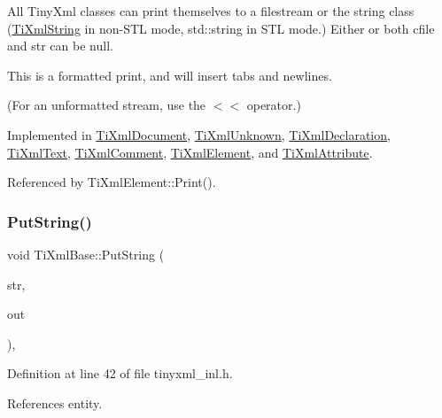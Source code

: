 All Tiny\+Xml classes can print themselves to a filestream or the string class (\hyperlink{class_ti_xml_string}{Ti\+Xml\+String} in non-\/\+S\+TL mode, std\+::string in S\+TL mode.) Either or both cfile and str can be null.

This is a formatted print, and will insert tabs and newlines.

(For an unformatted stream, use the $<$$<$ operator.) 

Implemented in \hyperlink{class_ti_xml_document_aa9e166fae51da603641380a964f21eeb}{Ti\+Xml\+Document}, \hyperlink{class_ti_xml_unknown_a5793fbc48ab3419783c0e866ca2d334e}{Ti\+Xml\+Unknown}, \hyperlink{class_ti_xml_declaration_ae46cff6565f299210ab945e78bf28514}{Ti\+Xml\+Declaration}, \hyperlink{class_ti_xml_text_a75f6895906333894e2574cc8cf77ea79}{Ti\+Xml\+Text}, \hyperlink{class_ti_xml_comment_a873171beac19d40f0eaae945711c98ed}{Ti\+Xml\+Comment}, \hyperlink{class_ti_xml_element_aa31a15cddfb8601a31236fe7d2569fb4}{Ti\+Xml\+Element}, and \hyperlink{class_ti_xml_attribute_a68ae373e03b9c35be4c9d0c3c233b894}{Ti\+Xml\+Attribute}.



Referenced by Ti\+Xml\+Element\+::\+Print().

\hypertarget{class_ti_xml_base_a283ddc4f1f53a53e7111eff4e12a63d9}{}\label{class_ti_xml_base_a283ddc4f1f53a53e7111eff4e12a63d9} 
\subsubsection{\texorpdfstring{Put\+String()}{PutString()}}
{\footnotesize\ttfamily void Ti\+Xml\+Base\+::\+Put\+String (\begin{DoxyParamCaption}\item[{const \hyperlink{tinyxml_8h_a92bada05fd84d9a0c9a5bbe53de26887}{T\+I\+X\+M\+L\+\_\+\+S\+T\+R\+I\+NG} \&}]{str,  }\item[{\hyperlink{tinyxml_8h_a92bada05fd84d9a0c9a5bbe53de26887}{T\+I\+X\+M\+L\+\_\+\+S\+T\+R\+I\+NG} $\ast$}]{out }\end{DoxyParamCaption})\hspace{0.3cm}{\ttfamily [static]}, {\ttfamily [protected]}}



Definition at line 42 of file tinyxml\+\_\+inl.\+h.



References entity.



